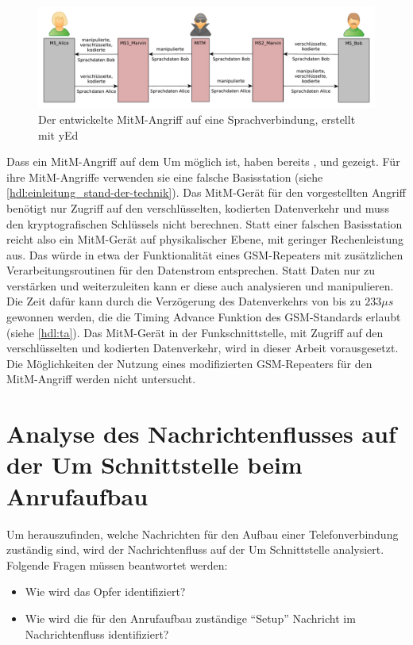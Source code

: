 \begin{figure}[H]
	\centering \includegraphics[width=1.0\linewidth]{figures/mitm_in_voice_connection.pdf}
	\caption[Der entwickelte MitM-Angriff auf eine Sprachverbindung]{Der entwickelte \ac{MitM}-Angriff auf eine Sprachverbindung, erstellt mit yEd} \label{fig:mitm-in-voice-con}
\end{figure}

Dass ein \ac{MitM}-Angriff auf dem \ac{Um} möglich ist, haben bereits \citet{barkan2003instant}, \citet{meyer2004man} und \citet{paget2010practical} gezeigt. Für ihre \ac{MitM}-Angriffe verwenden sie eine falsche Basisstation (siehe \autoref{hdl:einleitung_stand-der-technik}). Das \ac{MitM}-Gerät für den vorgestellten Angriff benötigt nur Zugriff auf den verschlüsselten, kodierten Datenverkehr und muss den kryptografischen Schlüssels nicht berechnen. Statt einer falschen Basisstation reicht also ein \ac{MitM}-Gerät auf physikalischer Ebene, mit geringer Rechenleistung aus. Das würde in etwa der Funktionalität eines \ac{GSM}-Repeaters mit zusätzlichen Verarbeitungsroutinen für den Datenstrom entsprechen. Statt Daten nur zu verstärken und weiterzuleiten kann er diese auch analysieren und manipulieren. Die Zeit dafür kann durch die Verzögerung des Datenverkehrs von bis zu $233 \mu s$ gewonnen werden, die die Timing Advance Funktion des \ac{GSM}-Standards erlaubt (siehe \autoref{hdl:ta}). Das \ac{MitM}-Gerät in der Funkschnittstelle, mit Zugriff auf den verschlüsselten und kodierten Datenverkehr, wird in dieser Arbeit vorausgesetzt. Die Möglichkeiten der Nutzung eines modifizierten \ac{GSM}-Repeaters für den \ac{MitM}-Angriff werden nicht untersucht.

\section{Analyse des Nachrichtenflusses auf der Um Schnittstelle beim Anrufaufbau}\label{hdl:call-setup-message-flow-analysis}

Um herauszufinden, welche Nachrichten für den Aufbau einer Telefonverbindung zuständig sind, wird der Nachrichtenfluss auf der Um Schnittstelle analysiert. Folgende Fragen müssen beantwortet werden:
\begin{itemize}
\item Wie wird das Opfer identifiziert?
\item Wie wird die für den Anrufaufbau zuständige "`Setup"' Nachricht im Nachrichtenfluss identifiziert?
\end{itemize}

